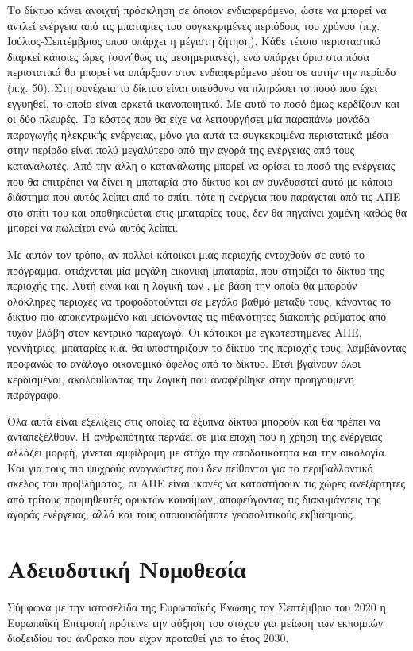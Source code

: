 \documentclass[12pt]{report}
\begin{document}
Το δίκτυο κάνει ανοιχτή πρόσκληση σε όποιον ενδιαφερόμενο, ώστε να μπορεί να αντλεί ενέργεια από τις μπαταρίες του συγκεκριμένες περιόδους του χρόνου (π.χ. Ιούλιος-Σεπτέμβριος οπου υπάρχει η μέγιστη ζήτηση). Κάθε τέτοιο περισταστικό 
διαρκεί κάποιες ώρες (συνήθως τις μεσημεριανές), ενώ υπάρχει όριο στα πόσα περιστατικά θα μπορεί να υπάρξουν στον ενδιαφερόμενο μέσα σε αυτήν την περίοδο (π.χ. 50). Στη συνέχεια το δίκτυο 
είναι υπεύθυνο να πληρώσει το ποσό που έχει εγγυηθεί, το οποίο είναι αρκετά ικανοποιητικό. Με αυτό το ποσό όμως κερδίζουν και οι δύο πλευρές. Το κόστος που θα είχε να λειτουργήσει μία παραπάνω μονάδα παραγωγής ηλεκρικής ενέργειας, 
μόνο για αυτά τα συγκεκριμένα περιστατικά μέσα στην περίοδο είναι πολύ μεγαλύτερο από την αγορά της ενέργειας από τους καταναλωτές. Από την άλλη ο καταναλωτής μπορεί να ορίσει το ποσό της ενέργειας που θα 
επιτρέπει να δίνει η μπαταρία στο δίκτυο και αν συνδυαστεί αυτό με κάποιο διάστημα που αυτός λείπει από το σπίτι, τότε η ενέργεια που παράγεται από τις ΑΠΕ στο σπίτι του και αποθηκεύεται στις μπαταρίες τους, δεν θα πηγαίνει 
χαμένη καθώς θα μπορεί να πωλείται ενώ αυτός λείπει. 

Με αυτόν τον τρόπο, αν πολλοί κάτοικοι μιας περιοχής ενταχθούν σε αυτό το πρόγραμμα, φτιάχνεται μία μεγάλη εικονική μπαταρία, που στηρίζει το δίκτυο της περιοχής της. Αυτή είναι και η λογική των {}, με βάση την
οποία θα μπορούν ολόκληρες περιοχές να τροφοδοτούνται σε μεγάλο βαθμό μεταξύ τους, κάνοντας το δίκτυο πιο αποκεντρωμένο και μειώνοντας τις πιθανότητες διακοπής ρεύματος από τυχόν βλάβη στον κεντρικό παραγωγό. Οι κάτοικοι με
εγκατεστημένες ΑΠΕ, γεννήτριες, μπαταρίες κ.α. θα υποστηρίζουν το δίκτυο της περιοχής τους, λαμβάνοντας προφανώς το ανάλογο οικονομικό όφελος από το δίκτυο. Έτσι βγαίνουν όλοι κερδισμένοι, ακολουθώντας την λογική που αναφέρθηκε 
στην προηγούμενη παράγραφο.

Όλα αυτά είναι εξελίξεις στις οποίες τα έξυπνα δίκτυα μπορούν και θα πρέπει να ανταπεξέλθουν. Η ανθρωπότητα περνάει σε μια εποχή που η χρήση της ενέργειας αλλάζει μορφή, γίνεται αμφίδρομη με στόχο την αποδοτικότητα και την οικολογία.
Και για τους πιο ψυχρούς αναγνώστες που δεν πείθονται για το περιβαλλοντικό σκέλος του προβλήματος, οι ΑΠΕ είναι ικανές να καταστήσουν τις χώρες ανεξάρτητες από τρίτους προμηθευτές ορυκτών καυσίμων, αποφεύγοντας τις διακυμάνσεις της 
αγοράς ενέργειας, αλλά και τους οποιουσδήποτε γεωπολιτικούς εκβιασμούς.

\pagebreak
\section*{Αδειοδοτική Νομοθεσία}
Σύμφωνα με την ιστοσελίδα της Ευρωπαϊκής Ένωσης \parencite{eu2022} τον Σεπτέμβριο του 2020 η Ευρωπαϊκή Επιτροπή πρότεινε την αύξηση του στόχου για μείωση των εκπομπών διοξειδίου του άνθρακα που είχαν προταθεί για το έτος 2030.
\end{document}
